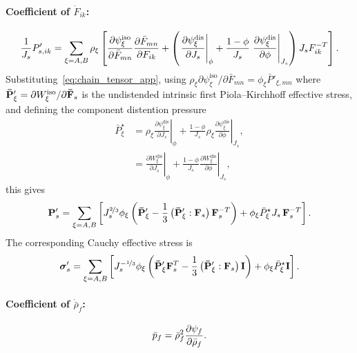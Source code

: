 \paragraph{Coefficient of $\dot{F}_{ik}$:}
\begin{align}
  \frac{1}{J_s} P'_{s,ik} = \sum_{\xi=A,B} \rho_\xi \left[\frac{\partial \psi^{\text{iso}}_\xi}{\partial \bar{F}_{mn}} \frac{\partial \bar{F}_{mn}}{\partial F_{ik}} + \left(\left.\frac{\partial \psi^{\text{dis}}_\xi}{\partial J_s}\right\vert_\phi + \frac{1-\phi}{J_s}\left.\frac{\partial \psi^{\text{dis}}_\xi}{\partial \phi}\right\vert_{J_s}\right) J_s F^{-T}_{ik}\right].
  \label{eq:Fdot_coeff}
\end{align}
Substituting~\eqref{eq:chain_tensor_app}, using $\rho_\xi \partial\psi^{\text{iso}}_\xi / \partial\bar{F}_{mn} = \phi_\xi \bar{P}'_{\xi,mn}$ where $\mathbf{\bar P}'_\xi = \partial W^{\text{iso}}_\xi / \partial\mathbf{\bar F}_s$ is the undistended intrinsic first Piola--Kirchhoff effective stress, and defining the component distention pressure
\begin{align}
  \bar{P}^\star_\xi &= \left.\rho_\xi \frac{\partial \psi^{\text{dis}}_\xi}{\partial J_s}\right\vert_\phi + \frac{1-\phi}{J_s}\left.\rho_\xi\frac{\partial \psi^{\text{dis}}_\xi}{\partial\phi}\right\vert_{J_s}, \\
   &= \left.\frac{\partial W^{\text{dis}}_\xi}{\partial J_s}\right\vert_\phi + \frac{1-\phi}{J_s}\left.\frac{\partial W^{\text{dis}}_\xi}{\partial\phi}\right\vert_{J_s},
\end{align}
this gives
\begin{align}
  \mathbf{P}'_s = \sum_{\xi=A,B} \left[J_s^{\nicefrac{2}{3}} \phi_\xi \left(\mathbf{\bar P}'_\xi - \frac{1}{3}\left(\mathbf{\bar P}'_\xi : \mathbf{F}_s\right) \mathbf{F}_s^{-T}\right) + \phi_\xi \bar{P}^\star_\xi J_s\, \mathbf{F}_s^{-T}\right].
  \label{eq:P_CN_direct}
\end{align}
The corresponding Cauchy effective stress is
\begin{align}
  \boldsymbol{\sigma}'_s = \sum_{\xi=A,B}\left[J_s^{-\nicefrac{1}{3}} \phi_\xi \left(\mathbf{\bar P}'_\xi \mathbf{F}_s^T - \frac{1}{3}\left(\mathbf{\bar P}'_\xi : \mathbf{F}_s\right) \mathbf{I}\right) + \phi_\xi \bar{P}^\star_\xi \mathbf{I}\right].
  \label{eq:sigma_CN}
\end{align}

\paragraph{Coefficient of $\dot{\bar\rho}_f$:}
\begin{align}
  \bar{p}_f = \bar\rho_f^2 \frac{\partial \psi_f}{\partial \bar\rho_f}.
  \label{eq:thermo_pressure}
\end{align}

